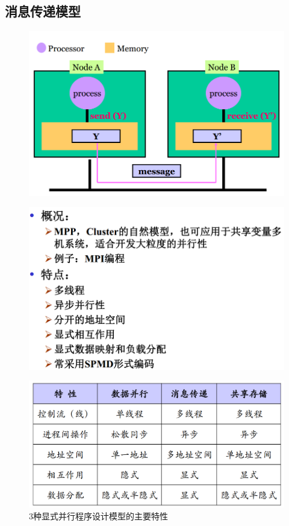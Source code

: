 \documentclass[UTF8,a4paper]{ctexart}
\begin{document}
\subsection{消息传递模型}
\begin{figure}[H]
  \centering
  \includegraphics[scale = 0.3]{assets/ParallelComputing_c77cf.png}
\end{figure}
\begin{figure}[H]
  \centering
  \includegraphics[scale = 0.3]{assets/ParallelComputing_2e5f4.png}
\end{figure}


\begin{figure}[H]
  \centering
  \includegraphics[scale = 0.3]{assets/ParallelComputing_b362b.png}
  \caption{3种显式并行程序设计模型的主要特性}
\end{figure}
\end{document}
